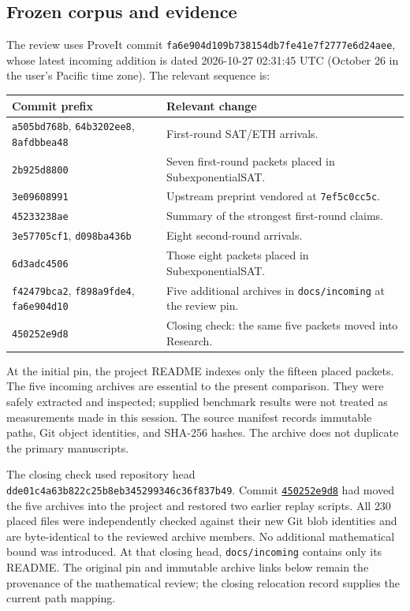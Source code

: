 \documentclass[11pt]{article}
\theoremstyle{remark}\newtheorem{remark}[theorem]{Remark}
\newcommand{\pin}{\texttt{fa6e904d109b738154db7fe41e7f2777e6d24aee}}
\begin{document}
\subsection{Frozen corpus and evidence}
The review uses ProveIt commit \pin, whose latest incoming addition is dated
2026-10-27 02:31:45 UTC (October 26 in the user's Pacific time zone).
The relevant sequence is:
\begin{center}\small
\begin{tabular}{p{4.4cm}p{9.8cm}}
\toprule
Commit prefix & Relevant change\\\midrule
\texttt{a505bd768b}, \texttt{64b3202ee8}, \texttt{8afdbbea48}
 & First-round SAT/ETH arrivals.\\
\texttt{2b925d8800} & Seven first-round packets placed in SubexponentialSAT.\\
\texttt{3e09608991} & Upstream preprint vendored at \texttt{7ef5c0cc5c}.\\
\texttt{45233238ae} & Summary of the strongest first-round claims.\\
\texttt{3e57705cf1}, \texttt{d098ba436b}
 & Eight second-round arrivals.\\
\texttt{6d3adc4506} & Those eight packets placed in SubexponentialSAT.\\
\texttt{f42479bca2}, \texttt{f898a9fde4}, \texttt{fa6e904d10}
 & Five additional archives in \texttt{docs/incoming} at the review pin.\\
\texttt{450252e9d8} & Closing check: the same five packets moved into Research.\\
\bottomrule
\end{tabular}\end{center}
At the initial pin, the project README indexes only the fifteen placed packets. The five
incoming archives are essential to the present comparison. They were safely
extracted and inspected; supplied benchmark results were not treated as
measurements made in this session. The source manifest records immutable
paths, Git object identities, and SHA-256 hashes. The archive does not
duplicate the primary manuscripts.

The closing check used repository head
\texttt{dde01c4a63b822c25b8eb345299346c36f837b49}. Commit
\href{https://github.com/VladimirReshetnikov/ProveIt/commit/450252e9d86c155f188b485629b9755c5c665371}{\texttt{450252e9d8}}
had moved the five archives into the project and restored two earlier replay
scripts. All $230$ placed files were independently checked against their
new Git blob identities and are byte-identical to the reviewed archive
members. No additional mathematical bound was introduced. At that closing
head, \texttt{docs/incoming} contains only its README. The original pin and
immutable archive links below remain the provenance of the mathematical
review; the closing relocation record supplies the current path mapping.
\end{document}
